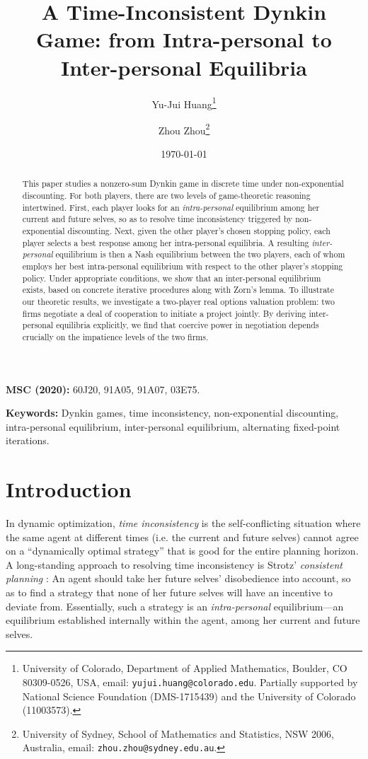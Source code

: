 \documentclass[11pt,reqno]{article}
\title{A Time-Inconsistent Dynkin Game: from Intra-personal to Inter-personal Equilibria}
\author{Yu-Jui Huang\thanks{
University of Colorado, Department of Applied Mathematics, Boulder, CO 80309-0526, USA, email: \texttt{yujui.huang@colorado.edu}. Partially supported by National Science Foundation (DMS-1715439) and the University of Colorado (11003573).}
 \and Zhou Zhou\thanks{
University of Sydney, School of Mathematics and Statistics, NSW 2006, Australia, email: \texttt{zhou.zhou@sydney.edu.au}.}
}
\date{\today}
\numberwithin{equation}{section}
\begin{document}
\maketitle

\begin{abstract}
This paper studies a nonzero-sum Dynkin game in discrete time under non-exponential discounting. For both players, there are two levels of game-theoretic reasoning intertwined. First, each player looks for an {\it intra-personal} equilibrium among her current and future selves, so as to resolve time inconsistency triggered by non-exponential discounting. Next, given the other player's chosen stopping policy, each player selects a best response among her intra-personal equilibria. A resulting {\it inter-personal} equilibrium is then a Nash equilibrium between the two players, each of whom employs her best intra-personal equilibrium with respect to the other player's stopping policy. Under appropriate conditions, we show that an inter-personal equilibrium exists, based on concrete iterative procedures along with Zorn's lemma. To illustrate our theoretic results, we investigate a two-player real options valuation problem: two firms negotiate a deal of cooperation to initiate a project jointly. By deriving inter-personal equilibria explicitly, we find that coercive power in negotiation depends crucially on the impatience levels of the two firms.  
\end{abstract}

\textbf{MSC (2020):} 
60J20,  %
91A05,  	%
91A07,   %
03E75.  %
\smallskip

\textbf{Keywords:} Dynkin games, time inconsistency, non-exponential discounting, intra-personal equilibrium, inter-personal equilibrium, alternating fixed-point iterations. 





\section{Introduction}
In dynamic optimization, {\it time inconsistency} is the self-conflicting situation where the same agent at different times (i.e. the current and future selves) cannot agree on a ``dynamically optimal strategy'' that is good for the entire planning horizon. A long-standing approach to resolving time inconsistency is Strotz' {\it consistent planning} \cite{Strotz55}: An agent should take her future selves' disobedience into account, so as to find a strategy that none of her future selves will have an incentive to deviate from. Essentially, such a strategy is an {\it intra-personal} equilibrium---an equilibrium established internally within the agent, among her current and future selves. 
\end{document}
